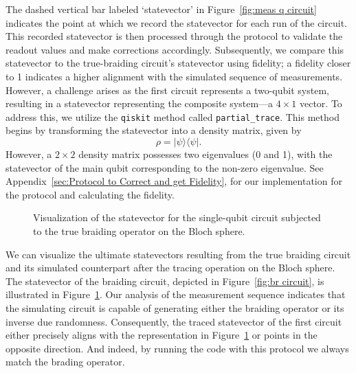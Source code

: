 \documentclass{article}
\begin{document}
The dashed vertical bar labeled `statevector' in Figure~\ref{fig:meas q circuit} indicates the point at which we record the statevector for each run of the circuit. This recorded statevector is then processed through the protocol to validate the readout values and make corrections accordingly. Subsequently, we compare this statevector to the true-braiding circuit's statevector using fidelity; a fidelity closer to 1 indicates a higher alignment with the simulated sequence of measurements. However, a challenge arises as the first circuit represents a two-qubit system, resulting in a statevector representing the composite system—a \(4 \times 1\) vector. To address this, we utilize the \texttt{qiskit} method called \texttt{partial\_trace}. This method begins by transforming the statevector into a density matrix, given by 
\[\rho = | \psi \rangle \langle \psi | .\]
However, a \(2 \times 2\) density matrix possesses two eigenvalues (0 and 1), with the statevector of the main qubit corresponding to the non-zero eigenvalue. See Appendix~\ref{sec:Protocol to Correct and get Fidelity}, for our implementation for the protocol and calculating the fidelity.
\begin{figure}
  \begin{center}
    
  \end{center}
  \caption{Visualization of the statevector for the single-qubit circuit subjected to the true braiding operator on the Bloch sphere.}\label{fig:br in bloch}
\end{figure}
We can visualize the ultimate statevectors resulting from the true braiding circuit and its simulated counterpart after the tracing operation on the Bloch sphere. The statevector of the braiding circuit, depicted in Figure~\ref{fig:br circuit}, is illustrated in Figure~\ref{fig:br in bloch}. Our analysis of the measurement sequence indicates that the simulating circuit is capable of generating either the braiding operator or its inverse due randomness. Consequently, the traced statevector of the first circuit either precisely aligns with the representation in Figure~\ref{fig:br in bloch} or points in the opposite direction. And indeed, by running the code with this protocol we always match the brading operator.
\end{document}
